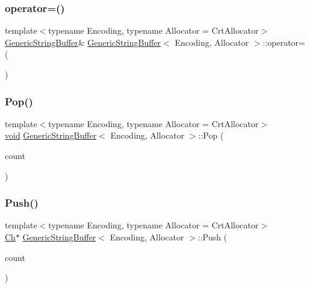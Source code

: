 \subsubsection{\texorpdfstring{operator=()}{operator=()}}
{\footnotesize\ttfamily template$<$typename Encoding, typename Allocator = Crt\+Allocator$>$ \\
\hyperlink{classGenericStringBuffer}{Generic\+String\+Buffer}\& \hyperlink{classGenericStringBuffer}{Generic\+String\+Buffer}$<$ Encoding, Allocator $>$\+::operator= (\begin{DoxyParamCaption}\item[{const \hyperlink{classGenericStringBuffer}{Generic\+String\+Buffer}$<$ Encoding, Allocator $>$ \&}]{ }\end{DoxyParamCaption})\hspace{0.3cm}{\ttfamily [private]}}

\mbox{\label{classGenericStringBuffer_a0038e53ba03c271bc4cbbac403ec4de4}} 
\subsubsection{\texorpdfstring{Pop()}{Pop()}}
{\footnotesize\ttfamily template$<$typename Encoding, typename Allocator = Crt\+Allocator$>$ \\
\hyperlink{imgui__impl__opengl3__loader_8h_ac668e7cffd9e2e9cfee428b9b2f34fa7}{void} \hyperlink{classGenericStringBuffer}{Generic\+String\+Buffer}$<$ Encoding, Allocator $>$\+::Pop (\begin{DoxyParamCaption}\item[{size\+\_\+t}]{count }\end{DoxyParamCaption})\hspace{0.3cm}{\ttfamily [inline]}}

\mbox{\label{classGenericStringBuffer_a49fd10cdd5dd97a4cf9813d01334d660}} 
\subsubsection{\texorpdfstring{Push()}{Push()}}
{\footnotesize\ttfamily template$<$typename Encoding, typename Allocator = Crt\+Allocator$>$ \\
\hyperlink{classGenericStringBuffer_a735b75db076ffe86d0d294be49655d46}{Ch}$\ast$ \hyperlink{classGenericStringBuffer}{Generic\+String\+Buffer}$<$ Encoding, Allocator $>$\+::Push (\begin{DoxyParamCaption}\item[{size\+\_\+t}]{count }\end{DoxyParamCaption})\hspace{0.3cm}{\ttfamily [inline]}}

